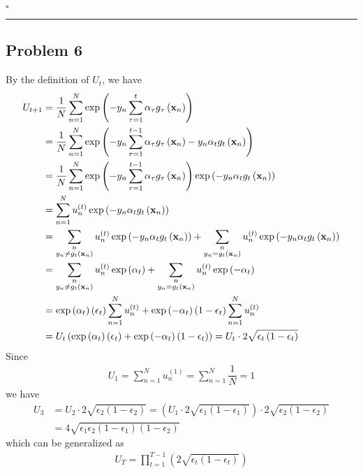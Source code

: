 \documentclass[12pt]{article}
\newcommand*{\QEDB}{\hfill\ensuremath{\square}}
\newcommand{\ParTh}[1]{\left(#1\right)}
\newcommand{\BF}[1]{{\bf#1}}
\newcommand{\horrule}[1]{\rule{\linewidth}{#1}}
\begin{document}
\QEDB

\horrule{0.5pt}

\subsection*{Problem 6}

By the definition of $U_{t}$, we have
\begin{align}
U_{t+1}&=\dfrac{1}{N}\sum_{n=1}^{N}\exp\ParTh{-y_n\sum_{\tau=1}^{t}\alpha_\tau g_\tau\ParTh{\BF{x}_n}}\\
&=\dfrac{1}{N}\sum_{n=1}^{N}\exp\ParTh{-y_n\sum_{\tau=1}^{t-1}\alpha_\tau g_\tau\ParTh{\BF{x}_n}-y_n\alpha_tg_t\ParTh{\BF{x}_n}}\\
&=\dfrac{1}{N}\sum_{n=1}^{N}\exp\ParTh{-y_n\sum_{\tau=1}^{t-1}\alpha_\tau g_\tau\ParTh{\BF{x}_n}}\exp\ParTh{-y_n\alpha_tg_t\ParTh{\BF{x}_n}}\\%
&=\sum_{n=1}^{N}u^{\ParTh{t}}_n\exp\ParTh{-y_n\alpha_tg_t\ParTh{\BF{x}_n}}\\
&=\sum_{\substack{n \\ y_n\neq g_t\ParTh{\BF{x}_n}}}u^{\ParTh{t}}_n\exp\ParTh{-y_n\alpha_tg_t\ParTh{\BF{x}_n}}+\sum_{\substack{n \\ y_n=g_t\ParTh{\BF{x}_n}}}u^{\ParTh{t}}_n\exp\ParTh{-y_n\alpha_tg_t\ParTh{\BF{x}_n}}\\
&=\sum_{\substack{n \\ y_n\neq g_t\ParTh{\BF{x}_n}}}u^{\ParTh{t}}_n\exp\ParTh{\alpha_t}+\sum_{\substack{n \\ y_n=g_t\ParTh{\BF{x}_n}}}u^{\ParTh{t}}_n\exp\ParTh{-\alpha_t}\\
&=\exp\ParTh{\alpha_t}\ParTh{\epsilon_t}\sum_{n=1}^{N}u^{\ParTh{t}}_n+\exp\ParTh{-\alpha_t}\ParTh{1-\epsilon_t}\sum_{n=1}^{N}u^{\ParTh{t}}_n\\
&=U_t\ParTh{\exp\ParTh{\alpha_t}\ParTh{\epsilon_t}+\exp\ParTh{-\alpha_t}\ParTh{1-\epsilon_t}}=U_t\cdot2\sqrt{\epsilon_t\ParTh{1-\epsilon_t}}
\end{align}
Since
\begin{align}
U_{1}=\sum_{n=1}^{N}u^{\ParTh{1}}_n=\sum_{n=1}^{N}\dfrac{1}{N}=1
\end{align}
we have
\begin{align}
U_3&=U_2\cdot2\sqrt{\epsilon_2\ParTh{1-\epsilon_2}}=\ParTh{U_1\cdot2\sqrt{\epsilon_1\ParTh{1-\epsilon_1}}}\cdot2\sqrt{\epsilon_2\ParTh{1-\epsilon_2}}\\
&=4\sqrt{\epsilon_1\epsilon_2\ParTh{1-\epsilon_1}\ParTh{1-\epsilon_2}}
\end{align}
which can be generalized as
\begin{align}
U_{T}=\prod_{t=1}^{T-1}\ParTh{2\sqrt{\epsilon_t\ParTh{1-\epsilon_t}}}
\end{align}
\end{document}
